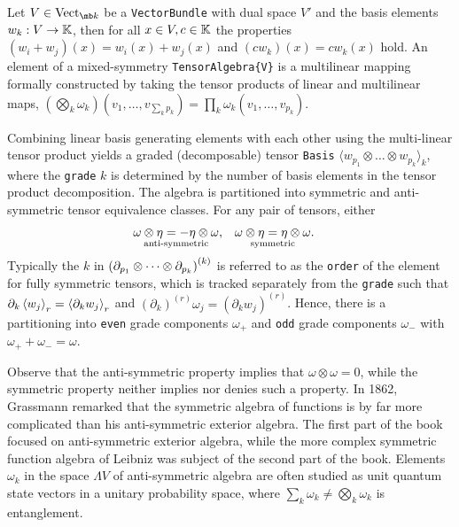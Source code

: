 \documentclass[]{article}
\begin{document}
\begin{definition}
	Let $V\in\text{Vect}_{\mb k}$ be a \verb`VectorBundle` with dual space $V'$ and the basis elements $w_k:V\rightarrow\mathbb{K}$, then for all $x\in V,c\in\mathbb{K}$ the properties $(w_i+w_j)(x) = w_i(x)+w_j(x)$ and $(cw_k)(x) = cw_k(x)$ hold.
	An element of a mixed-symmetry \verb`TensorAlgebra{V}` is a multilinear mapping formally constructed by taking the tensor products of linear and multilinear maps,
	$(\bigotimes_k \omega_k)(v_1,\dots,v_{\sum_k p_k}) = \prod_k \omega_k(v_1,\dots,v_{p_k})$.
\end{definition}
\begin{definition}
	Combining linear basis generating elements with each other using the multi-linear tensor product yields a graded (decomposable) tensor \verb`Basis` $\langle w_{p_1}\otimes\dots\otimes w_{p_k}\rangle_k$, where the \verb`grade` $k$ is determined by the number of basis elements in the tensor product decomposition.
	The algebra is partitioned into symmetric and anti-symmetric tensor equivalence classes.
	For any pair of tensors, either
	\begin{align*}
		&\underset{\text{anti-symmetric}}{\omega\otimes\eta = -\eta\otimes\omega}, & &\underset{\text{symmetric}}{\omega\otimes\eta = \eta\otimes\omega}.
	\end{align*}
	Typically the $k$ in $\left(\partial_{p_1}\otimes\cdots\otimes\partial_{p_k}\right)^{(k)}$ is referred to as the \verb`order` of the element for fully symmetric tensors, which is tracked separately from the \verb`grade` such that $\partial_k\left\langle w_j \right\rangle_r = \left\langle \partial_kw_j \right\rangle_r$ and $(\partial_k)^{(r)}\omega_j = (\partial_kw_j)^{(r)}$.
	Hence, there is a partitioning into \verb`even` grade components $\omega_+$ and \verb`odd` grade components $\omega_-$ with $\omega_++\omega_-=\omega$.
\end{definition}
\begin{remark}
	Observe that the anti-symmetric property implies that $\omega\otimes\omega=0$, while the symmetric property neither implies nor denies such a property.
	In 1862, Grassmann remarked \cite{grassmann-2} that the symmetric algebra of functions is by far more complicated than his anti-symmetric exterior algebra.
	The first part of the book focused on anti-symmetric exterior algebra, while the more complex symmetric function algebra of Leibniz was subject of the second part of the book.
	Elements $\omega_k$ in the space $\Lambda V$ of anti-symmetric algebra are often studied as unit quantum state vectors in a unitary probability space, where $\sum_k\omega_k\neq\bigotimes_k\omega_k$ is entanglement.
\end{remark}
\end{document}
